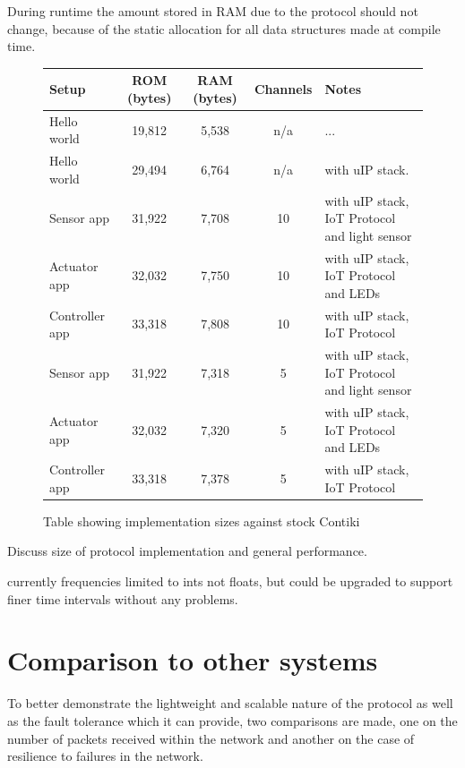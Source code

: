 During runtime the amount stored in RAM due to the protocol should not change, because of the static allocation for all data structures made at compile time.
\begin{figure}[h]
\begin{center}
    \begin{tabular}{| l | c | c | c | l |}
    \hline
    Setup & ROM (bytes) & RAM (bytes) & Channels & Notes \\ \hline
    Hello world & 19,812 & 5,538 & n/a &... \\ \hline
    Hello world & 29,494 & 6,764 & n/a & with uIP stack. \\ \hline
    Sensor app & 31,922 & 7,708 & 10 & with uIP stack, IoT Protocol and light sensor\\ \hline
    Actuator app & 32,032 & 7,750 & 10 & with uIP stack, IoT Protocol and LEDs \\ \hline
    Controller app & 33,318 & 7,808 & 10 & with uIP stack, IoT Protocol \\ \hline
    Sensor app & 31,922 & 7,318 & 5 & with uIP stack, IoT Protocol and light sensor\\ \hline
    Actuator app & 32,032 & 7,320 & 5 & with uIP stack, IoT Protocol and LEDs \\ \hline
    Controller app & 33,318 & 7,378 & 5 & with uIP stack, IoT Protocol \\ 
    \hline
    \end{tabular}
\end{center}
\caption{Table showing implementation sizes against stock Contiki}
\label{tab:size}
\end{figure}



Discuss size of protocol implementation and general performance.

currently frequencies limited to ints not floats, but could be upgraded to support finer time intervals without any problems.

\section{Comparison to other systems} %
\label{sec:comparison_to_other_systems}
To better demonstrate the lightweight and scalable nature of the protocol as well as the fault tolerance which it can provide, two comparisons are made, one on the number of packets received within the network and another on the case of resilience to failures in the network.


